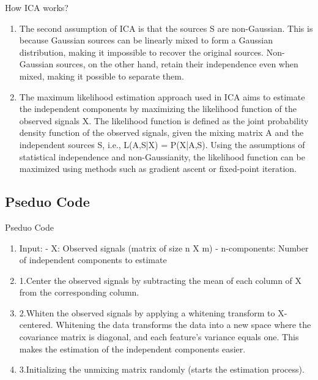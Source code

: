 \documentclass{beamer}
\begin{document}
\begin{frame}{How ICA works?}
    \begin{enumerate}
        \item The second assumption of ICA is that the sources S are non-Gaussian. This is because Gaussian sources can be linearly mixed to form a Gaussian distribution, making it impossible to recover the original sources. Non-Gaussian sources, on the other hand, retain their independence even when mixed, making it possible to separate them.
        \item The maximum likelihood estimation approach used in ICA aims to estimate the independent components by maximizing the likelihood function of the observed signals X. The likelihood function is defined as the joint probability density function of the observed signals, given the mixing matrix A and the independent sources S, i.e., L(A,S|X) = P(X|A,S). Using the assumptions of statistical independence and non-Gaussianity, the likelihood function can be maximized using methods such as gradient ascent or fixed-point iteration.
    \end{enumerate}
\end{frame}

\subsection{Pseduo Code}
\begin{frame}{Pseduo Code}
    \begin{enumerate}
        \item Input: \newline
        - X: Observed signals (matrix of size n X m) \newline
        - n-components: Number of independent components to estimate
        \item 1.Center the observed signals by subtracting the mean of each column of X from the corresponding column.
        \item 2.Whiten the observed signals by applying a whitening transform to X-centered. Whitening the data transforms the data into a new space where the covariance matrix is diagonal, and each feature's variance equals one. This makes the estimation of the independent components easier.
        \item 3.Initializing the unmixing matrix randomly (starts the estimation process).
    \end{enumerate}
\end{frame}
\end{document}
